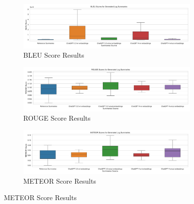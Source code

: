 \documentclass[conference]{IEEEtran}
\begin{document}
\begin{figure}[t]

\begin{subfigure}{\textwidth}
    \centering
    \includegraphics[width=\textwidth]{final/img/results/bleu-scores.png}
    \caption{BLEU Score Results}
    \label{fig:bleu-scores}
\end{subfigure}

\begin{subfigure}{\textwidth}
    \centering
    \includegraphics[width=\textwidth]{final/img/results/rouge-scores.png}
    \caption{ROUGE Score Results}
    \label{fig:rouge-scores}
\end{subfigure}

\begin{subfigure}{\textwidth}
    \centering
    \includegraphics[width=\textwidth]{final/img/results/meteor-scores.png}
    \caption{METEOR Score Results}
    \label{fig:meteor-scores}
\end{subfigure}

\end{figure}
\end{document}
